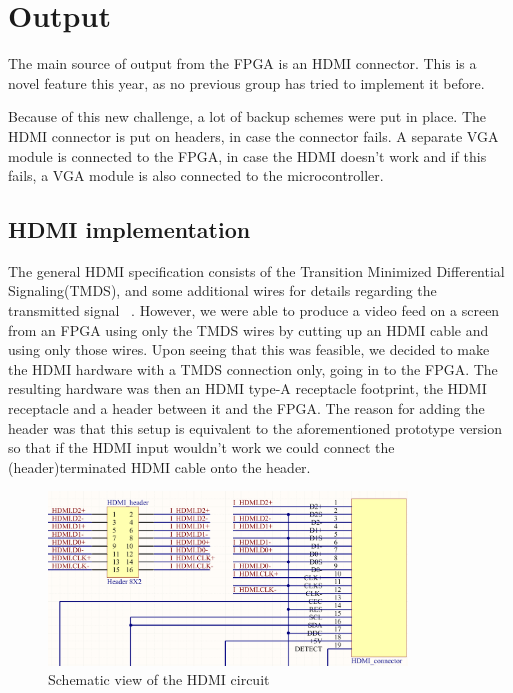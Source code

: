 \documentclass[../main/report.tex]{subfiles}
\begin{document}
\section{Output}
The main source of output from the FPGA is an HDMI connector.
This is a novel feature this year, as no previous group has tried to implement it before.

Because of this new challenge, a lot of backup schemes were put in place.
The HDMI connector is put on headers, in case the connector fails.
A separate VGA module is connected to the FPGA, in case the HDMI doesn't work and if this fails, a VGA module is also connected to the microcontroller.

\subsection{HDMI implementation}

The general HDMI specification consists of the Transition Minimized Differential Signaling(TMDS), and some additional wires for details regarding the transmitted signal ~\cite{hdmi-pinout}.
However, we were able to produce a video feed on a screen from an FPGA using only the TMDS wires by cutting up an HDMI cable and using only those wires.
Upon seeing that this was feasible, we decided to make the HDMI hardware with a TMDS connection only, going in to the FPGA. The resulting hardware was then an HDMI type-A receptacle footprint, the HDMI receptacle and a header between it and the FPGA.
The reason for adding the header was that this setup is equivalent to the aforementioned prototype version so that if the HDMI input wouldn't work we could connect the (header)terminated HDMI cable onto the header.

\begin{figure}[H]
	\centering
	\includegraphics[width=0.85\textwidth]{../pcb/assets/HDMI-schematic.png}
	\caption{Schematic view of the HDMI circuit}
	\label{fig: HDMI schematic}
\end{figure}
\end{document}
